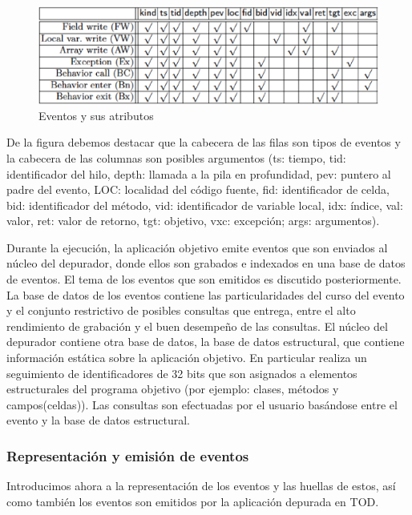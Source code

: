 \documentclass[12pt,legalpaper]{report}
\begin{document}
\begin{figure}[h]
	\centering
	\includegraphics[scale=0.5]{images/TOD/EventsAttributes.eps}
	\caption{Eventos y sus atributos}
	\label{EventsAttributes}
\end{figure}

De la figura debemos destacar que la cabecera de las filas son tipos de eventos y la cabecera de las columnas son posibles argumentos (ts: tiempo, tid: identificador del hilo, depth: llamada a la pila en profundidad, pev: puntero al padre del evento, LOC: localidad del código fuente, fid: identificador de celda, bid: identificador del método, vid: identificador de variable local, idx: índice, val: valor, ret: valor de retorno, tgt: objetivo, vxc: excepción; args: argumentos).

Durante la ejecución, la aplicación objetivo emite eventos que son enviados al núcleo del depurador, donde ellos son grabados e indexados en una base de datos de eventos.  El tema de los eventos que son emitidos es discutido posteriormente.  La base de datos de los eventos contiene las particularidades del curso del evento y el conjunto restrictivo de posibles consultas que entrega, entre el alto rendimiento de grabación y el buen desempeño de las consultas.  El núcleo del depurador contiene otra base de datos, la base de datos estructural, que contiene información estática sobre la aplicación objetivo.  En particular realiza un seguimiento de identificadores de 32 bits que son asignados a elementos estructurales del programa objetivo (por ejemplo: clases, métodos y campos(celdas)).  Las consultas son efectuadas por el usuario basándose entre el evento y la base de datos estructural.

			\subsubsection{Representación y emisión de eventos}

Introducimos ahora a la representación de los eventos y las huellas de estos, así como también los eventos son emitidos por la aplicación depurada en TOD.
\end{document}
